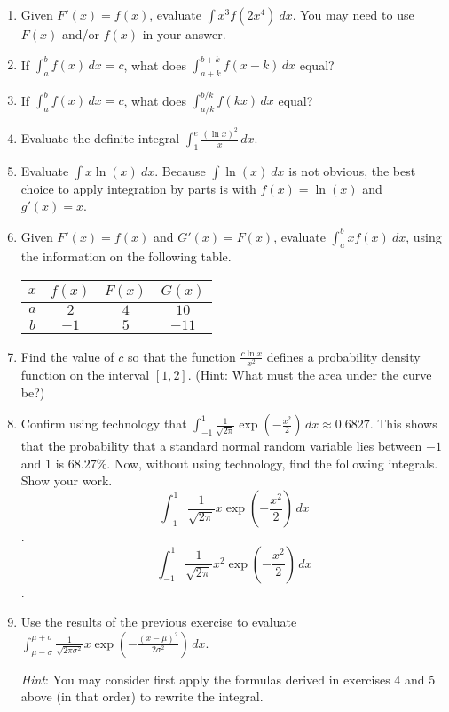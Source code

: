 \documentclass{article}
\begin{document}
\begin{enumerate}
                    \item Given $F'(x)=f(x)$, evaluate $ \int x^3f(2x^4)\ dx$. You may need to use $F(x)$ and/or $f(x)$ in your answer.
                    \item If $ \int_a^b f(x)\,dx = c$, what does 
                    $ \int_{a+k}^{b+k} f(x-k)\,dx$ equal? 
                    \item If $ \int_a^b f(x)\,dx = c$, what does 
                    $ \int_{a/k}^{b/k} f(kx)\,dx$ equal?
                    \item Evaluate the definite integral 
                    $ \int_{1}^{e} \frac{(\ln{x})^2}{x}\,dx$.
                    \item Evaluate $ \int x\ln(x)\ dx$.  Because $\int \ln(x)\ dx$ is not obvious, the best choice to apply integration by parts is with $f(x)=\ln(x)$ and $g'(x)=x$.
                    \item Given $F'(x)=f(x)$ and $G'(x)=F(x)$, evaluate $ \int_a^b xf(x)\ dx$, using the information on the following table. \\
                        \begin{center}
                        \begin{tabular}{|c|c|c|c|}
                        \hline
                        $x$ & $f(x)$ & $F(x)$ & $G(x)$ \\
                        \hline
                        $a$ & $2$ & $4$ & $10$ \\
                        \hline
                        $b$ & $-1$ & $5$ & $-11$ \\
                        \hline 
                        \end{tabular}
                        \end{center}
                        \medskip
                        
                    \item Find the value of $c$ so that the function 
                    $ \frac{c\ln{x}}{x^2}$ defines a probability density function on the interval $[1,2]$. (Hint: What must the area under the curve be?)
                    
                    \item Confirm using technology that $ \int_{-1}^{1} \frac{1}{\sqrt{2\pi}} \exp\left(-\frac{x^2}{2}\right)\,dx \approx 0.6827$. This shows that the probability that a standard normal random variable lies between $-1$ and $1$ is $68.27\%$. Now, without using technology, find the following integrals. Show your work.
                    $$ \int_{-1}^{1} \frac{1}{\sqrt{2\pi}}x \exp\left(-\frac{x^2}{2}\right)\,dx$$.
                    $$ \int_{-1}^{1} \frac{1}{\sqrt{2\pi}}x^2 \exp\left(-\frac{x^2}{2}\right)\,dx$$.
                    \item Use the results of the previous exercise to evaluate $ \int_{\mu-\sigma}^{\mu+\sigma} \frac{1}{\sqrt{2\pi \sigma^2}}x \exp\left(-\frac{(x-\mu)^2}{2\sigma^2}\right)\,dx$. 
                    
                    \emph{Hint}: You may consider first apply the formulas derived in exercises 4 and 5 above (in that order) to rewrite the integral.

                \end{enumerate}
\end{document}

